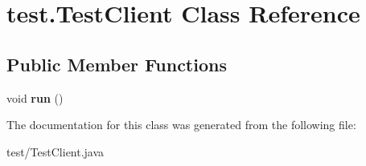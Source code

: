 \hypertarget{classtest_1_1_test_client}{
\section{test.\-Test\-Client \-Class \-Reference}
\label{classtest_1_1_test_client}
}
\subsection*{\-Public \-Member \-Functions}
\begin{DoxyCompactItemize}
\item 
\hypertarget{classtest_1_1_test_client_abf8cf8cc2515f69c820fa6135ab450e6}{
void {\bfseries run} ()}
\label{classtest_1_1_test_client_abf8cf8cc2515f69c820fa6135ab450e6}

\end{DoxyCompactItemize}


\-The documentation for this class was generated from the following file\-:\begin{DoxyCompactItemize}
\item 
test/\-Test\-Client.\-java\end{DoxyCompactItemize}
